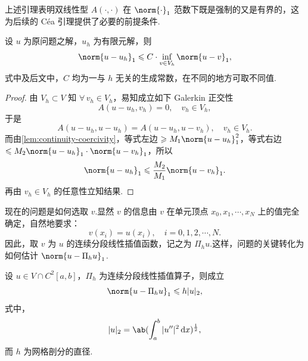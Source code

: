 上述引理表明双线性型 $A(\cdot,\cdot)$ 在 $\norm{\cdot}_1$ 范数下既是强制的又是有界的，这为后续的
C\'ea 引理提供了必要的前提条件.

\begin{lemma}
设 $u$ 为原问题之解，$u_h$ 为有限元解，则
\begin{equation*}
\norm{u - u_h}_1 \leq C \cdot \inf_{v \in V_h} \norm{u - v}_1,
\end{equation*}
式中及后文中，$C$ 均为一与 $h$ 无关的生成常数，在不同的地方可取不同值.
\end{lemma}

\begin{proof}
由 $V_h \subset V$ 知 $\forall\, v_h \in V_h$，易知成立如下 Galerkin 正交性
\begin{equation*}
A(u - u_h, v_h) = 0, \quad v_h \in V_h,
\end{equation*}
于是
\begin{equation*}
A(u - u_h, u - u_h) = A(u - u_h, u - v_h), \quad v_h \in V_h.
\end{equation*}
而由\cref{lem:continuity-coercivity}，等式左边 $\geq M_1 \norm{u - u_h}_1^2$，等式右边 $\leq M_2
\norm{u - u_h}_1 \cdot \norm{u - v_h}_1$，所以
\begin{equation*}
\norm{u - u_h}_1 \leq \frac{M_2}{M_1} \norm{u - v_h}_1.
\end{equation*}
再由 $v_h \in V_h$ 的任意性立知结果.
\end{proof}

现在的问题是如何选取 $v$.显然 $v$ 的信息由 $v$ 在单元顶点 $x_0, x_1, \cdots, x_N$
上的值完全确定，自然地要求：
\begin{equation*}
v(x_i) = u(x_i), \quad i = 0, 1, 2, \cdots, N.
\end{equation*}
因此，取 $v$ 为 $u$ 的连续分段线性插值函数，记之为 $\Pi_h u$.这样，问题的关键转化为如何估计
$\norm{u - \Pi_h u}_1$.

\begin{lemma}
设 $u \in V \cap C^2[a,b]$，$\Pi_h$ 为连续分段线性插值算子，则成立
\begin{equation*}
\norm{u - \Pi_h u}_1 \leq h |u|_2,
\end{equation*}
式中，
\begin{equation*}
|u|_2 = \ab(\int_a^b |u''|^2 \d x)^{\frac{1}{2}},
\end{equation*}
而 $h$ 为网格剖分的直径.
\end{lemma}

